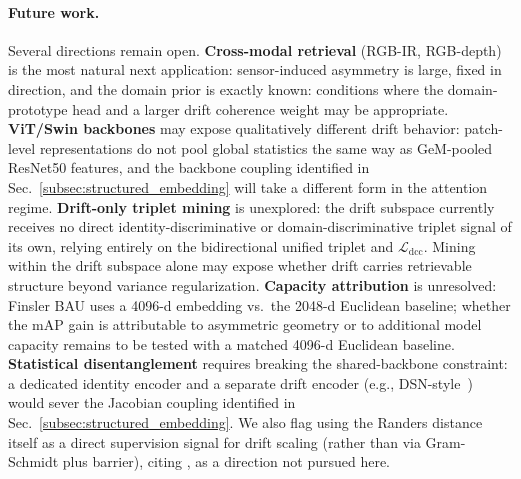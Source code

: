 \paragraph{Future work.}
Several directions remain open. \textbf{Cross-modal retrieval} (RGB-IR, RGB-depth) is the most natural next application: sensor-induced asymmetry is large, fixed in direction, and the domain prior is exactly known: conditions where the domain-prototype head and a larger drift coherence weight may be appropriate. \textbf{ViT/Swin backbones} may expose qualitatively different drift behavior: patch-level representations do not pool global statistics the same way as GeM-pooled ResNet50 features, and the backbone coupling identified in Sec.~\ref{subsec:structured_embedding} will take a different form in the attention regime. \textbf{Drift-only triplet mining} is unexplored: the drift subspace currently receives no direct identity-discriminative or domain-discriminative triplet signal of its own, relying entirely on the bidirectional unified triplet and $\mathcal{L}_{\mathrm{dcc}}$. Mining within the drift subspace alone may expose whether drift carries retrievable structure beyond variance regularization. \textbf{Capacity attribution} is unresolved: Finsler BAU uses a 4096-d embedding vs.\ the 2048-d Euclidean baseline; whether the mAP gain is attributable to asymmetric geometry or to additional model capacity remains to be tested with a matched 4096-d Euclidean baseline. \textbf{Statistical disentanglement} requires breaking the shared-backbone constraint: a dedicated identity encoder and a separate drift encoder (e.g., DSN-style~\cite{bousmalis2016domain}) would sever the Jacobian coupling identified in Sec.~\ref{subsec:structured_embedding}. We also flag using the Randers distance itself as a direct supervision signal for drift scaling (rather than via Gram-Schmidt plus barrier), citing \cite{bao2000introduction,randers1941geometry}, as a direction not pursued here.

